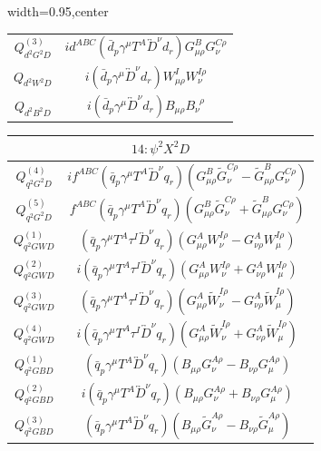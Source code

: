 \begin{table}[H]
\begin{center}
\begin{adjustbox}{width=0.95\textwidth,center}
\begin{minipage}[t]{5.9cm}
\begin{tabular}[t]{c|c}
%
$Q_{d^2G^2D}^{(3)}$  &  $i d^{ABC} (\bar d_p \gamma^\mu T^A \overleftrightarrow{D}^\nu d_r) G_{\mu\rho}^B G_{\nu}^{C\rho}$ \\
%
$Q_{d^2W^2D}$  &  $i (\bar d_p \gamma^\mu \overleftrightarrow{D}^\nu d_r) W_{\mu\rho}^I W_{\nu}^{I\rho}$ \\
%
$Q_{d^2B^2D}$  &  $i (\bar d_p \gamma^\mu \overleftrightarrow{D}^\nu d_r) B_{\mu\rho} B_\nu^{\,\,\,\rho}$ 
\end{tabular}
\end{minipage}
\hspace{1cm}
\begin{minipage}[t]{7.4cm}
\renewcommand{\arraystretch}{1.5}
\begin{tabular}[t]{c|c}
\multicolumn{2}{c}{\boldmath$14:\psi^2X^2D$} \\
\hline
$Q_{q^2G^2D}^{(4)}$  &  $i f^{ABC} (\bar q_p \gamma^\mu T^A \overleftrightarrow{D}^\nu q_r) (G_{\mu\rho}^B \widetilde{G}_{\nu}^{C\rho} - \widetilde{G}_{\mu\rho}^B G_\nu^{C \rho})$ \\
%
$Q_{q^2G^2D}^{(5)}$  &  $f^{ABC} (\bar q_p \gamma^\mu T^A \overleftrightarrow{D}^\nu q_r) (G_{\mu\rho}^B \widetilde{G}_{\nu}^{C\rho} + \widetilde{G}_{\mu\rho}^B G_\nu^{C \rho})$ \\
%
$Q_{q^2GWD}^{(1)}$  &  $(\bar q_p \gamma^\mu T^A \tau^I \overleftrightarrow{D}^\nu q_r) (G^A_{\mu\rho} W_{\nu}^{I\rho} - G^A_{\nu\rho} W_{\mu}^{I \rho})$ \\
%
$Q_{q^2GWD}^{(2)}$  &  $i (\bar q_p \gamma^\mu T^A \tau^I \overleftrightarrow{D}^\nu q_r) (G^A_{\mu\rho} W_{\nu}^{I\rho} + G^A_{\nu\rho} W_{\mu}^{I \rho})$ \\
%
$Q_{q^2GWD}^{(3)}$  &  $(\bar q_p \gamma^\mu T^A \tau^I \overleftrightarrow{D}^\nu q_r) (G_{\mu\rho}^A \widetilde{W}_\nu^{I \rho} - G_{\nu\rho}^A \widetilde{W}_\mu^{I \rho})$ \\
%
$Q_{q^2GWD}^{(4)}$  &  $i (\bar q_p \gamma^\mu T^A \tau^I \overleftrightarrow{D}^\nu q_r) (G_{\mu\rho}^A \widetilde{W}_\nu^{I \rho} + G_{\nu\rho}^A \widetilde{W}_\mu^{I \rho})$ \\
%
$Q_{q^2GBD}^{(1)}$  &  $(\bar q_p \gamma^\mu T^A \overleftrightarrow{D}^\nu q_r) (B_{\mu\rho} G_{\nu}^{A\rho} - B_{\nu\rho} G_{\mu}^{A\rho})$ \\
%
$Q_{q^2GBD}^{(2)}$  &  $i (\bar q_p \gamma^\mu T^A \overleftrightarrow{D}^\nu q_r) (B_{\mu\rho} G_{\nu}^{A\rho} + B_{\nu\rho} G_{\mu}^{A\rho})$ \\
%
$Q_{q^2GBD}^{(3)}$  &  $(\bar q_p \gamma^\mu T^A \overleftrightarrow{D}^\nu q_r) (B_{\mu\rho} \widetilde{G}_\nu^{A \rho} - B_{\nu\rho} \widetilde{G}_\mu^{A \rho})$ \\

\end{tabular}
\end{minipage}
\end{adjustbox}
\end{center}
\end{table}
